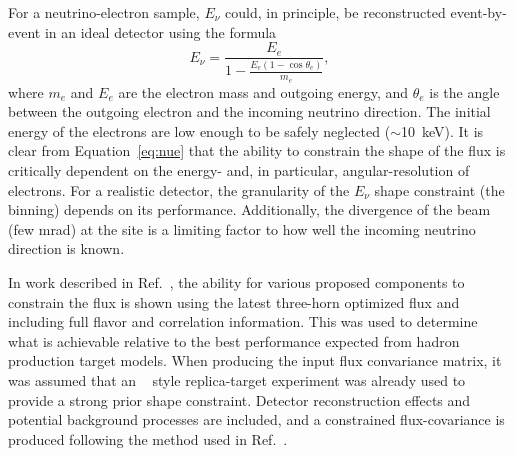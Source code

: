 For a neutrino-electron   sample, $E_{\nu}$ could, in principle, be reconstructed event-by-event in an ideal detector using the formula
\begin{equation}
  E_{\nu} = \frac{E_{e}}{1 - \frac{E_{e}(1-\cos\theta_{e})}{m_{e}}},
\label{eq:nue}
\end{equation}
\noindent where $m_e$ and $E_e$ are the electron mass and outgoing energy, and $\theta_e$ is the angle between the outgoing electron and the incoming neutrino direction. The initial energy of the electrons are low enough to be safely neglected ($\sim$\SI{10}{keV}). It is clear from Equation~\ref{eq:nue} that the ability to constrain the shape of the flux is critically dependent on the energy- and, in particular, angular-resolution of electrons. For a realistic detector, the granularity of the $E_{\nu}$ shape constraint (the binning) depends on its performance. Additionally, the divergence of the beam (few \si{mrad}) at the    site is a limiting factor to how well the incoming neutrino direction is known.

In work described in Ref.~\cite{dune_nue}, the ability for various proposed   components to constrain the  flux is shown using the latest three-horn optimized flux and including full flavor and correlation information.  This was used to determine what is achievable relative to the best performance expected from hadron production target models. When producing the input flux convariance matrix, it was assumed that an ~\cite{Laszlo:2009vg} style replica-target experiment was already used to provide a strong prior shape constraint. Detector reconstruction effects and potential background processes are included, and a constrained flux-covariance is produced following the method used in Ref.~\cite{Park:2015eqa}.

